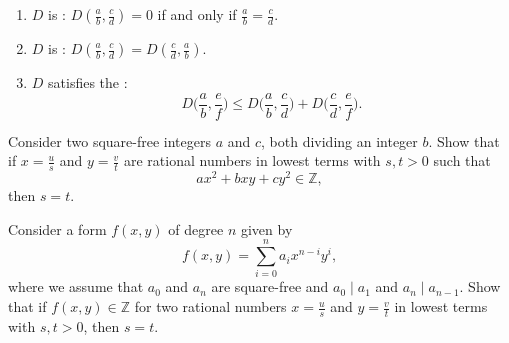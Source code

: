 \begin{routine}
\begin{enumerate}
  \item $D$ is : $D(\frac{a}{b},\frac{c}{d})=0$ if and only if $\frac{a}{b}=\frac{c}{d}$.
  \item $D$ is : $D(\frac{a}{b},\frac{c}{d})=D(\frac{c}{d},\frac{a}{b})$.
  \item $D$ satisfies the :
    \begin{equation*}
      D\Big(\frac{a}{b},\frac{e}{f}\Big)\leq D\Big(\frac{a}{b},\frac{c}{d}\Big)+D\Big(\frac{c}{d},\frac{e}{f}\Big).
    \end{equation*}
  \end{enumerate}
  \exercise \label{exercise:equal-denominators-rational-point-on-form}
  \begin{subexenum}
  \item Consider two square-free integers $a$ and $c$, both dividing an integer $b$. Show that if $x=\frac{u}{s}$ and $y=\frac{v}{t}$ are rational numbers in lowest terms with $s,t>0$ such that
    \begin{equation*}
      ax^2+bxy+cy^2\in\mathbb{Z},
    \end{equation*}
    then $s=t$.
  \item Consider a form $f(x,y)$ of degree $n$ given by
    \begin{equation*}
      f(x,y)=\sum_{i=0}^n a_i x^{n-i}y^i,
    \end{equation*}
    where we assume that $a_0$ and $a_n$ are square-free and $a_0\mid a_1$ and $a_n\mid a_{n-1}$. Show that if $f(x,y)\in\mathbb{Z}$ for two rational numbers $x=\frac{u}{s}$ and $y=\frac{v}{t}$ in lowest terms with $s,t>0$, then $s=t$.
  \end{subexenum}
\end{routine}

